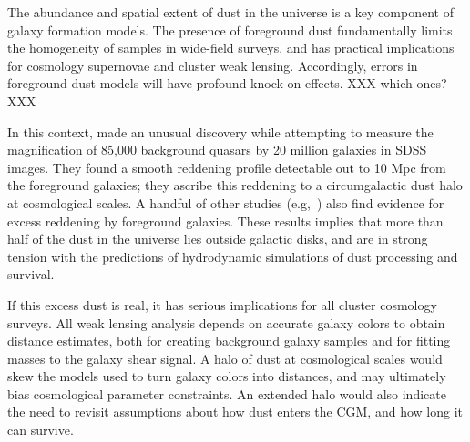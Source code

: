 \documentclass[11pt, oneside]{article}   	%
\begin{document}
The abundance and spatial extent of dust in the universe is a key component of galaxy formation models. The presence of foreground dust fundamentally limits the homogeneity of samples in wide-field surveys, and has practical implications for cosmology supernovae and cluster weak lensing. Accordingly, errors in foreground dust models will have profound knock-on effects. XXX which ones? XXX


In this context, \cite{menard2010measuring} made an unusual discovery while attempting to measure the magnification of 85,000 background quasars by 20 million galaxies in SDSS images. They found a smooth reddening profile detectable out to 10 Mpc from the foreground galaxies; they ascribe this reddening to a circumgalactic dust halo at cosmological scales. A handful of other studies (e.g,~\cite{peek2015dust}) also find evidence for excess reddening by foreground galaxies. %
These results implies that more than half of the dust in the universe lies outside galactic disks, and are in strong tension with the predictions of hydrodynamic simulations of dust processing and survival. 

If this excess dust is real, it has serious implications for all cluster cosmology surveys. All weak lensing analysis depends on accurate galaxy colors to obtain distance estimates, both for creating background galaxy samples and for fitting masses to the galaxy shear signal. A halo of dust at cosmological scales would skew the models used to turn galaxy colors into distances, and may ultimately bias cosmological parameter constraints. An extended halo would also indicate the need to revisit assumptions about how dust enters the CGM, and how long it can survive.
\end{document}
